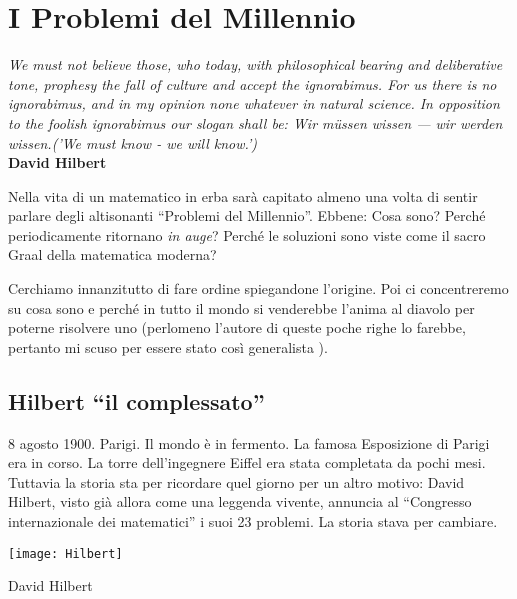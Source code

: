 \chapter{I Problemi del Millennio}
\begin{fullwidth}
	\begin{flushright}
		\emph{We must not believe those, who today, with philosophical bearing and deliberative tone, prophesy the fall of culture and accept the \emph{ignorabimus}. For us there is no \emph{ignorabimus}, and in my opinion none whatever in natural science. In opposition to the foolish \emph{ignorabimus} our slogan shall be: Wir m\"ussen wissen — wir werden wissen.('We must know - we will know.')%
			}\\
		\vspace{0.5cm}
		\bfseries{David Hilbert}
	\end{flushright}
\end{fullwidth}

Nella vita di un matematico in erba sarà capitato almeno una volta di sentir parlare degli altisonanti “Problemi del Millennio”. Ebbene: Cosa sono? Perché periodicamente ritornano \emph{in auge}? Perché le soluzioni sono viste come il sacro Graal della matematica moderna? 

Cerchiamo innanzitutto di fare ordine spiegandone l’origine. Poi ci concentreremo su cosa sono e perché in tutto il mondo si venderebbe l’anima al diavolo per poterne risolvere uno (perlomeno l’autore di queste poche righe lo farebbe, pertanto mi scuso per essere stato così generalista \smiley).

\section{Hilbert “il complessato”}

8 agosto  1900. Parigi. Il mondo è in fermento. La famosa Esposizione di Parigi era in corso. La torre dell’ingegnere Eiffel era stata completata da pochi mesi. Tuttavia la storia sta per ricordare quel giorno per un altro motivo: David Hilbert, visto già allora come una leggenda vivente, annuncia al “Congresso internazionale dei matematici” i suoi 23 problemi. La storia stava per cambiare. 

\begin{marginfigure}%
	\texttt{[image: Hilbert]}
	\caption{David Hilbert}
	\label{fig:Hilbert}
\end{marginfigure}

